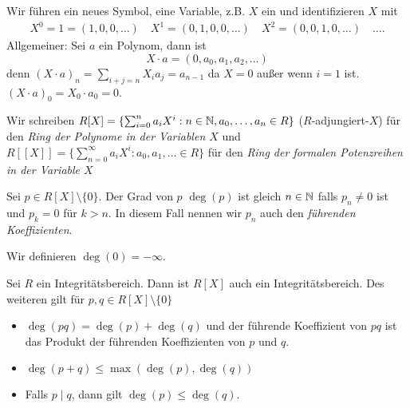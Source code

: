 \begin{notation}
	Wir führen ein neues Symbol, eine Variable, z.B. $X$ ein und identifizieren $X$ mit
	\begin{align*}
		X^{0} = 1 = (1,0,0,\ldots) \quad X^{1} = (0,1,0,0,\ldots) \quad X^2 = (0,0,1,0,\ldots) \quad \ldots
	.\end{align*}
	Allgemeiner: Sei $a$ ein Polynom, dann ist
	\[
		X \cdot a = (0,a_0,a_1,a_2,\ldots)
	\]
	denn $(X\cdot a)_{n} = \sum_{i+j=n} X_{i} a_{j} = a_{n-1}$ 
	da $X = 0$ außer wenn $i = 1$ ist. $(X\cdot a)_{0} = X_0\cdot a_0 = 0$.

	Wir schreiben $R[X] = \{\sum_{i=0}^{n} a_{i} X^{i} : n \in \mathbb{N}, a_0,\ldots,a_{n} \in R\}$ ($R$-adjungiert-$X$) für den \emph{Ring der Polynome in der Variablen $X$}
	und $R[\![ X ]\!] = \{\sum_{n=0}^{\infty} a_{i} X^{i} : a_0,a_1,\ldots \in R\} $ für den \emph{Ring der formalen Potenzreihen in der Variable $X$}
\end{notation}

\begin{definition}
	Sei $p \in R[X] \setminus \{0\}$. Der Grad von $p$ $\deg(p)$ ist gleich $n \in \mathbb{N}$ falls $p_{n} \neq 0$ ist und
	$p_{k} = 0$ für $k> n$. In diesem Fall nennen wir $p_{n}$ auch den \emph{führenden Koeffizienten}.
	
	Wir definieren $\deg(0) = - \infty$.
\end{definition}

\begin{proposition}
	Sei $R$ ein Integritätsbereich. Dann ist $R[X]$ auch ein Integritätsbereich.
	Des weiteren gilt für $p,q \in R[X] \setminus \{0\} $ 
	\begin{itemize}
		\item $\deg(pq) = \deg(p) + \deg(q)$ und der führende Koeffizient von $pq$ ist das Produkt der führenden Koeffizienten von $p$ und $q$.
		\item $\deg(p+q) \leq \max(\deg(p), \deg(q))$ 
		\item Falls $p \mid q$, dann gilt $\deg(p) \leq \deg(q)$.
	\end{itemize}
\end{proposition}

